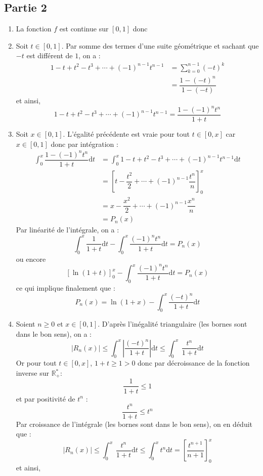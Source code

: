 \documentclass[a4paper,twoside,french,10pt]{VcCours}
\newcommand{\dt}{\text{d}t}
\begin{document}
\subsection*{Partie 2}


\begin{enumerate}
\item La fonction $f$ est continue sur $[0,1]$ donc

\item Soit $t \in [0,1]$. Par somme des termes d'une suite géométrique et sachant que $-t$ est différent de $1$, on a :
\begin{align*}
1-t+t^{2}-t^{3}+\cdots+\left(  -1\right)  ^{n-1}t^{n-1} & = \sum_{k=0}^{n-1} (-t)^k \\
& = \dfrac{1-(-t)^n}{1-(-t)}
\end{align*}
et ainsi,
$$ \boxed{1-t+t^{2}-t^{3}+\cdots+\left(  -1\right)  ^{n-1}t^{n-1}   =\dfrac{1-\left(  -1\right)
^{n}t^{n}}{1+t}}$$

\item Soit $x \in [0,1]$. L'égalité précédente est vraie pour tout $t \in [0,x]$ car $x \in [0,1]$ donc par intégration :
\begin{align*}
\int_0^x \dfrac{1-\left(  -1\right)^{n}t^{n}}{1+t} \dt & = \int_0^x 1-t+t^{2}-t^{3}+\cdots+\left(  -1\right)  ^{n-1}t^{n-1} \dt \\
& = \left[ t - \dfrac{t^2}{2} + \cdots + (-1)^{n-1} \dfrac{t^n}{n} \right]_0^x \\
& = x - \dfrac{x^2}{2} + \cdots + (-1)^{n-1} \dfrac{x^n}{n} \\
& = P_n(x)
\end{align*}
Par linéarité de l'intégrale, on a :
$$ \int_0^x \dfrac{1}{1+t} \dt - \int_0^x \dfrac{\left(  -1\right)^{n}t^{n}}{1+t} \dt = P_n(x)$$
ou encore 
$$ \left[\ln(1+t)\right]_0^x - \int_0^x \dfrac{\left(  -1\right)^{n}t^{n}}{1+t} \dt = P_n(x)$$
ce qui implique finalement que :
$$ \boxed{P_n(x) = \ln(1+x) - \int_0^x \dfrac{(-t)^{n}}{1+t} \dt }$$



\item Soient $n \geq 0$ et $x \in [0,1]$. D'après l'inégalité triangulaire (les bornes sont dans le bon sens), on a :
$$ \vert R_n(x) \vert \leq \int_0^x \left\vert \dfrac{(-t)^n}{1+t} \right\vert \dt  \leq \int_0^x \ \dfrac{t^n}{1+t} \dt$$
Or pour tout $t \in [0,x]$, $1+t \geq 1>0$ donc par décroissance de la fonction inverse sur $\mathbb{R}_+^{*}$:
$$ \dfrac{1}{1+t} \leq 1$$
et par positivité de $t^n$ :
$$ \dfrac{t^n}{1+t} \leq t^n$$
Par croissance de l'intégrale (les bornes sont dans le bon sens), on en déduit que :
$$  \vert R_n(x) \vert \leq \int_0^x \ \dfrac{t^n}{1+t} \dt \leq \int_0^x t^n \dt = \left[\dfrac{t^{n+1}}{n+1} \right]_0^x$$
et ainsi,


\end{enumerate}
\end{document}
